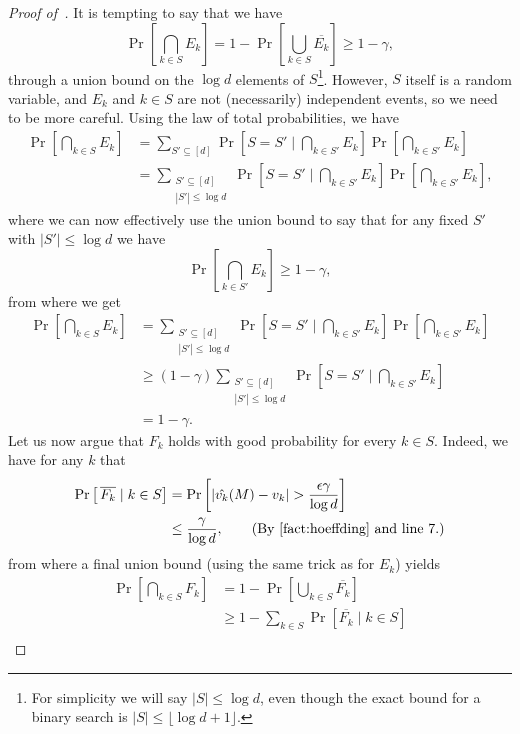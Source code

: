 \begin{proof}[Proof of~]
It is tempting to say that we have 
\[ 
	\Pr\left[\bigcap_{k \in S} E_k\right] = 1 -  \Pr\left[\bigcup_{k \in S} \overline{E_k} \right] \geq 1 - \gamma,
\]
through a union bound on the $\log d$ elements of $S$\footnote{For simplicity we will say $|S| \leq \log d$, even though the exact bound for a binary search is $|S| \leq \lfloor \log d  + 1 \rfloor$.}. However, $S$ itself is a random variable, and $E_k$ and $k \in S$ are not (necessarily) independent events, so we need to be more careful. 
Using the law of total probabilities, we have 
\begin{align*}
	\Pr\left[\bigcap_{k \in S} E_k\right] &= \sum_{S' \subseteq [d]} \Pr\left[S = S'  \mid \bigcap_{k \in S'} E_k \right] \Pr\left[\bigcap_{k \in S'} E_k\right]\\
	&= \sum_{\substack{S' \subseteq [d]\\ |S'| \leq \log d}} \Pr\left[S = S' \mid \bigcap_{k \in S'} E_k\right] \Pr\left[\bigcap_{k \in S'} E_k\right],
\end{align*}
where we can now effectively use the union bound to say that for any fixed $S'$ with $|S'| \leq \log d$ we have
\[ 
	\Pr\left[\bigcap_{k \in S'} E_k \right] \geq 1 - \gamma,
\]
from where we get
\begin{align*}
	\Pr\left[\bigcap_{k \in S} E_k\right] &=  \sum_{\substack{S' \subseteq [d]\\ |S'| \leq \log d}} \Pr\left[S = S'\mid \bigcap_{k \in S'} E_k\right] \Pr\left[\bigcap_{k \in S'} E_k\right]\\
	&\geq (1-\gamma) \sum_{\substack{S' \subseteq [d]\\ |S'| \leq \log d}} \Pr\left[S = S' \mid \bigcap_{k \in S'} E_k\right]\\
	&= 1 - \gamma.
\end{align*}
 Let us now argue that $F_k$ holds with good probability for every $k \in S$. Indeed, we have for any $k$ that
 \begin{align*}
 \Pr\left[ \, \overline{F_k} \mid k \in S \right] &= \Pr\left[|\hat{v_k}(M) - v_k| > \frac{\epsilon \gamma}{\log d}\right]\\
 	&\leq \frac{\gamma}{\log d}, \tag{By~\Cref{fact:hoeffding} and line 7.}
 \end{align*}
from where a final union bound (using the same trick as for $E_k$) yields 
\begin{align*}
	\Pr\left[\bigcap_{k \in S} F_k\right] &= 1 - \Pr\left[\bigcup_{k \in S} \overline{F_k}\right]\\
	&\geq 1 - \sum_{k \in S} \Pr\left[\overline{F_k} \mid k \in S\right]\\

\end{align*}
\end{proof}
